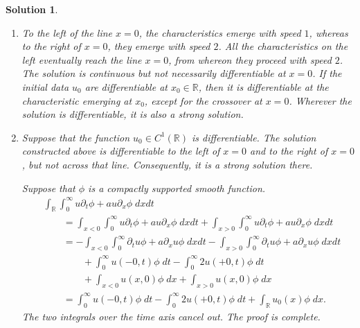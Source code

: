 \documentclass[10pt,letterpaper]{article}
\theoremstyle{break}
\newtheorem{mysolution}{Solution}
\newenvironment{solution}{\begin{mysolution}}{\end{mysolution}}
\begin{document}
\begin{solution}
    \begin{enumerate}
        \item
        To the left of the line $x=0$, the characteristics emerge with speed $1$, whereas to the right of $x=0$, they emerge with speed $2$.
        All the characteristics on the left eventually reach the line $x=0$, from whereon they proceed with speed $2$.
        The solution is continuous but not necessarily differentiable at $x=0$.
        If the initial data $u_{0}$ are differentiable at $x_0 \in \mathbb R$, then it is differentiable at the characteristic emerging at $x_0$, except for the crossover at $x=0$.
        Wherever the solution is differentiable, it is also a strong solution. 
        \item
        Suppose that the function $u_0 \in C^{1}(\mathbb R)$ is differentiable. 
        The solution constructed above is differentiable to the left of $x=0$ and to the right of $x=0$, but not across that line.
        Consequently, it is a strong solution there.
        
        Suppose that $\phi$ is a compactly supported smooth function. 
        \begin{align}
         &
         \int_{\mathbb R} \int_{0}^{\infty} u \partial_t \phi + a u \partial_x \phi \;dxdt
         \\&\qquad
         =
         \int_{x < 0} \int_{0}^{\infty} u \partial_t \phi + a u \partial_x \phi \;dxdt
         + 
         \int_{x > 0} \int_{0}^{\infty} u \partial_t \phi + a u \partial_x \phi \;dxdt
         \\
         &\qquad
         =
         -
         \int_{x < 0} \int_{0}^{\infty} \partial_t u \phi + a \partial_x u \phi \;dxdt
         - 
         \int_{x > 0} \int_{0}^{\infty} \partial_t u \phi + a \partial_x u \phi \;dxdt
         \\&\qquad \qquad 
         +
         \int_{0}^{\infty} u(-0,t) \phi \;dt
         - 
         \int_{0}^{\infty} 2u(+0,t) \phi \;dt
         \\&\qquad \qquad 
         +
         \int_{x < 0} u(x,0) \phi \;dx
         + 
         \int_{x > 0} u(x,0) \phi \;dx
         \\&\qquad 
         =
         \int_{0}^{\infty} u(-0,t) \phi \;dt
         - 
         \int_{0}^{\infty} 2u(+0,t) \phi \;dt
         +
         \int_{\mathbb R} u_{0}(x) \phi \;dx
         .
        \end{align}
        The two integrals over the time axis cancel out.
        The proof is complete.
    \end{enumerate}
\end{solution}
\end{document}
